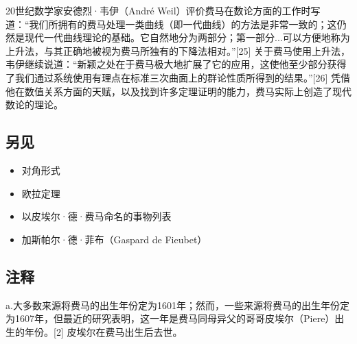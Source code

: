 20世纪数学家安德烈·韦伊（André Weil）评价费马在数论方面的工作时写道：“我们所拥有的费马处理一类曲线（即一代曲线）的方法是非常一致的；这仍然是现代一代曲线理论的基础。它自然地分为两部分；第一部分...可以方便地称为上升法，与其正确地被视为费马所独有的下降法相对。”[25] 关于费马使用上升法，韦伊继续说道：“新颖之处在于费马极大地扩展了它的应用，这使他至少部分获得了我们通过系统使用有理点在标准三次曲面上的群论性质所得到的结果。”[26] 凭借他在数值关系方面的天赋，以及找到许多定理证明的能力，费马实际上创造了现代数论的理论。
\subsection{另见}  
\begin{itemize}
\item 对角形式  
\item 欧拉定理  
\item 以皮埃尔·德·费马命名的事物列表  
\item 加斯帕尔·德·菲布（Gaspard de Fieubet）
\end{itemize}
\subsection{注释}  
a.大多数来源将费马的出生年份定为1601年；然而，一些来源将费马的出生年份定为1607年，但最近的研究表明，这一年是费马同母异父的哥哥皮埃尔（Piere）出生的年份。[2] 皮埃尔在费马出生后去世。
